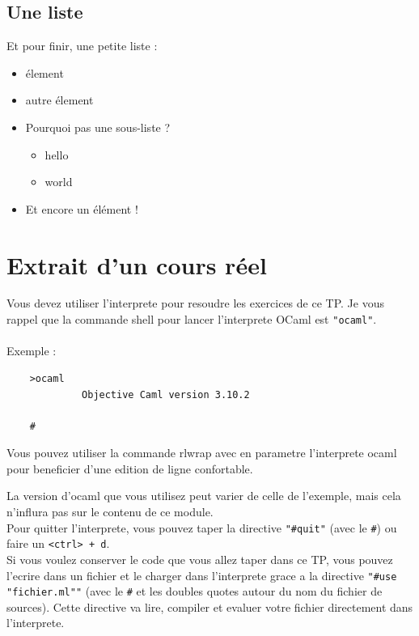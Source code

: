 \documentclass{life-fr}
\begin{document}
   \section{Une liste}
     Et pour finir, une petite liste :
     \begin{itemize}
      \item élement
      \item autre élement
      \item Pourquoi pas une sous-liste ?
        \begin{itemize}
          \item hello
          \item world
        \end{itemize}
      \item Et encore un élément !
     \end{itemize}

\chapter{Extrait d'un cours réel}

    Vous devez utiliser l'interprete pour resoudre les exercices de ce TP. Je
  vous rappel que la commande shell pour lancer l'interprete OCaml est
  \texttt{"ocaml"}.\\
\\  Exemple :

  \begin{lstlisting}
    >ocaml
             Objective Caml version 3.10.2

    #
  \end{lstlisting}

  \hint
  {
    Vous pouvez utiliser la commande rlwrap avec en parametre l'interprete ocaml
    pour beneficier d'une edition de ligne confortable.
  }

    La version d'ocaml que vous utilisez peut varier de celle de l'exemple, mais
  cela n'influra pas sur le contenu de ce module.\\
  Pour quitter l'interprete, vous pouvez taper la directive \texttt{"\#quit"}
  (avec le \texttt{\#}) ou faire un \texttt{<ctrl> + d}.\\

  Si vous voulez conserver le code que vous allez taper dans ce TP, vous pouvez
  l'ecrire dans un fichier et le charger dans l'interprete grace a la directive
  \texttt{"\#use "fichier.ml""} (avec le \texttt{\#} et les doubles quotes autour
  du nom du fichier de sources). Cette directive va lire, compiler et evaluer
  votre fichier directement dans l'interprete.\\
\end{document}
